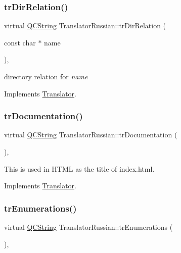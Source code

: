 \subsubsection{\texorpdfstring{trDirRelation()}{trDirRelation()}}
{\footnotesize\ttfamily virtual \mbox{\hyperlink{class_q_c_string}{Q\+C\+String}} Translator\+Russian\+::tr\+Dir\+Relation (\begin{DoxyParamCaption}\item[{const char $\ast$}]{name }\end{DoxyParamCaption})\hspace{0.3cm}{\ttfamily [inline]}, {\ttfamily [virtual]}}

directory relation for {\itshape name} 

Implements \mbox{\hyperlink{class_translator}{Translator}}.

\mbox{\label{class_translator_russian_aabeea469ea798ba856df5631c493d04c}} 
\subsubsection{\texorpdfstring{trDocumentation()}{trDocumentation()}}
{\footnotesize\ttfamily virtual \mbox{\hyperlink{class_q_c_string}{Q\+C\+String}} Translator\+Russian\+::tr\+Documentation (\begin{DoxyParamCaption}{ }\end{DoxyParamCaption})\hspace{0.3cm}{\ttfamily [inline]}, {\ttfamily [virtual]}}

This is used in H\+T\+ML as the title of index.\+html. 

Implements \mbox{\hyperlink{class_translator}{Translator}}.

\mbox{\label{class_translator_russian_abd005d80f797b8799a981695fd11326b}} 
\subsubsection{\texorpdfstring{trEnumerations()}{trEnumerations()}}
{\footnotesize\ttfamily virtual \mbox{\hyperlink{class_q_c_string}{Q\+C\+String}} Translator\+Russian\+::tr\+Enumerations (\begin{DoxyParamCaption}{ }\end{DoxyParamCaption})\hspace{0.3cm}{\ttfamily [inline]}, {\ttfamily [virtual]}}

